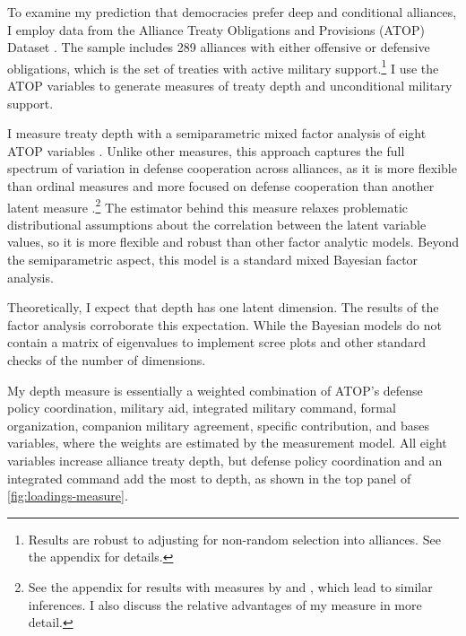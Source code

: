 \documentclass[12pt]{article}
\begin{document}
To examine my prediction that democracies prefer deep and conditional alliances, I employ data from the Alliance Treaty Obligations and Provisions (ATOP) Dataset \citep{Leedsetal2002}. 
The sample includes 289 alliances with either offensive or defensive obligations, which is the set of treaties with active military support.\footnote{Results are robust to adjusting for non-random selection into alliances. See the appendix for details.}
I use the ATOP variables to generate measures of treaty depth and unconditional military support. 


I measure treaty depth with a semiparametric mixed factor analysis of eight ATOP variables \citep{Murrayetal2013}.
Unlike other measures, this approach captures the full spectrum of variation in defense cooperation across alliances, as it is more flexible than ordinal measures \citep{LeedsAnac2005} and more focused on defense cooperation than another latent measure \citep{BensonClinton2016}.\footnote{See the appendix for results with measures by \citet{LeedsAnac2005} and \citet{BensonClinton2016}, which lead to similar inferences. I also discuss the relative advantages of my measure in more detail.}
The estimator behind this measure relaxes problematic distributional assumptions about the correlation between the latent variable values, so it is more flexible and robust than other factor analytic models. 
Beyond the semiparametric aspect, this model is a standard mixed Bayesian factor analysis. 


Theoretically, I expect that depth has one latent dimension. 
The results of the factor analysis corroborate this expectation.
While the Bayesian models do not contain a matrix of eigenvalues to implement scree plots and other standard checks of the number of dimensions.


My depth measure is essentially a weighted combination of ATOP's defense policy coordination, military aid, integrated military command, formal organization, companion military agreement, specific contribution, and bases variables, where the weights are estimated by the measurement model.  
All eight variables increase alliance treaty depth, but defense policy coordination and an integrated command add the most to depth, as shown in the top panel of \autoref{fig:loadings-measure}. 
\end{document}
